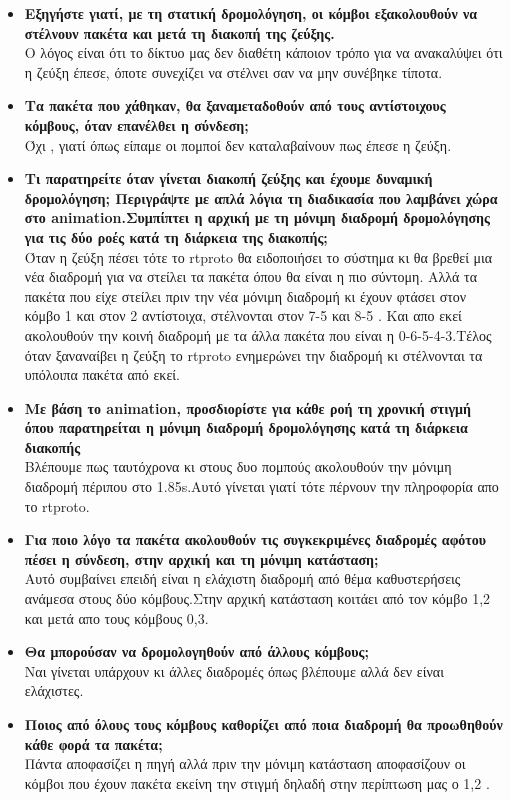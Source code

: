 \documentclass{article}
\begin{document}
\begin{itemize}
\item
\textbf{Εξηγήστε γιατί, με τη στατική δρομολόγηση, οι κόμβοι εξακολουθούν να στέλνουν
	πακέτα και μετά τη διακοπή της ζεύξης. } \\
Ο λόγος είναι ότι το δίκτυο μας δεν διαθέτη κάποιον τρόπο για να ανακαλύψει ότι η ζεύξη έπεσε, όποτε συνεχίζει να στέλνει σαν να μην συνέβηκε τίποτα.
\item \textbf{Τα πακέτα που χάθηκαν, θα ξαναμεταδοθούν από τους αντίστοιχους κόμβους, όταν
	επανέλθει η σύνδεση;}\\ Όχι , γιατί όπως είπαμε οι πομποί δεν καταλαβαίνουν πως έπεσε η ζεύξη.
\item \textbf{ Τι παρατηρείτε όταν γίνεται διακοπή ζεύξης και έχουμε δυναμική δρομολόγηση;
	Περιγράψτε με απλά λόγια τη διαδικασία που λαμβάνει χώρα στο animation.Συμπίπτει η
	αρχική με τη μόνιμη διαδρομή δρομολόγησης για τις δύο ροές κατά τη διάρκεια της
	διακοπής; }\\
Όταν η ζεύξη πέσει τότε το rtproto θα ειδοποιήσει το σύστημα κι θα βρεθεί μια νέα διαδρομή για να στείλει τα πακέτα όπου θα είναι η πιο σύντομη. Αλλά τα πακέτα που είχε στείλει πριν την νέα μόνιμη διαδρομή κι έχουν φτάσει στον κόμβο 1 και στον 2 αντίστοιχα, στέλνονται στον 7-5 και 8-5 . Και απο εκεί ακολουθούν την κοινή διαδρομή με τα άλλα πακέτα που είναι η 0-6-5-4-3.Τέλος όταν ξαναναίβει η ζεύξη το rtproto ενημερώνει την διαδρομή κι στέλνονται τα υπόλοιπα πακέτα από εκεί.
\item \textbf{Με βάση το animation, προσδιορίστε για κάθε ροή τη χρονική στιγμή όπου παρατηρείται
	η μόνιμη διαδρομή δρομολόγησης κατά τη διάρκεια διακοπής}\\
Βλέπουμε πως ταυτόχρονα κι στους δυο πομπούς ακολουθούν την μόνιμη διαδρομή πέριπου στο 1.85s.Αυτό γίνεται γιατί τότε πέρνουν την πληροφορία απο το rtproto.
\item \textbf{Για ποιο λόγο τα πακέτα ακολουθούν τις συγκεκριμένες διαδρομές αφότου πέσει η
	σύνδεση, στην αρχική και τη μόνιμη κατάσταση; }\\
Αυτό συμβαίνει επειδή είναι η ελάχιστη διαδρομή από θέμα καθυστερήσεις ανάμεσα στους δύο κόμβους.Στην αρχική κατάσταση κοιτάει από τον κόμβο 1,2 και μετά απο τους κόμβους 0,3.
\item \textbf{ Θα μπορούσαν να δρομολογηθούν από άλλους κόμβους; }\\ Ναι γίνεται υπάρχουν κι άλλες διαδρομές όπως βλέπουμε αλλά δεν είναι ελάχιστες.
\item \textbf{Ποιος από όλους τους κόμβους καθορίζει από ποια διαδρομή θα προωθηθούν κάθε φορά
	τα πακέτα; }\\ Πάντα αποφασίζει η πηγή αλλά πριν την μόνιμη κατάσταση αποφασίζουν οι κόμβοι που έχουν πακέτα εκείνη την στιγμή δηλαδή στην περίπτωση μας ο 1,2 .
\end{itemize}
\end{document}
